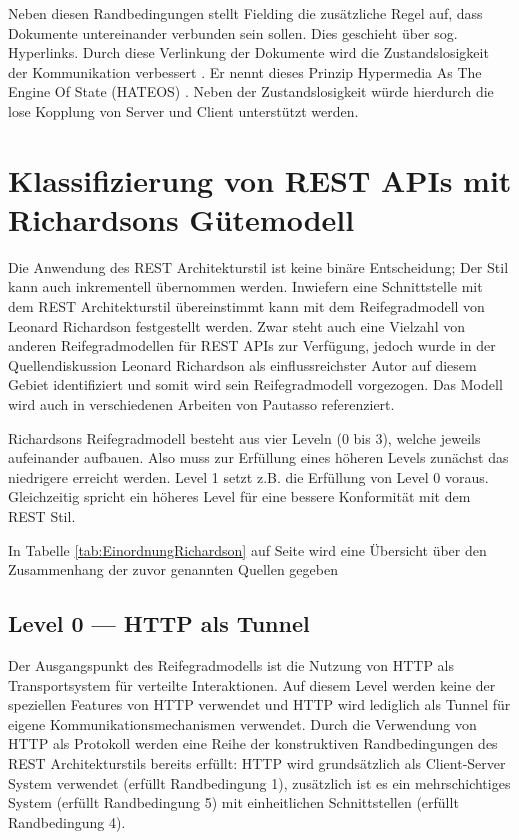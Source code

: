 Neben diesen Randbedingungen stellt Fielding die zusätzliche Regel auf, dass Dokumente untereinander verbunden sein sollen. Dies geschieht über sog. Hyperlinks. Durch diese Verlinkung der Dokumente wird die Zustandslosigkeit der Kommunikation verbessert . Er nennt dieses Prinzip Hypermedia As The Engine Of State (HATEOS)  . Neben der Zustandslosigkeit würde hierdurch die lose Kopplung von Server und Client unterstützt werden.

\section{Klassifizierung von REST APIs mit Richardsons Gütemodell}\label{section:klassifizierung-von-rest}

Die Anwendung des REST Architekturstil ist keine binäre Entscheidung; Der Stil kann auch inkrementell übernommen werden. Inwiefern eine Schnittstelle mit dem REST Architekturstil übereinstimmt kann mit dem Reifegradmodell von Leonard Richardson festgestellt werden. Zwar steht auch eine Vielzahl von anderen Reifegradmodellen für REST APIs zur Verfügung, jedoch wurde in der Quellendiskussion Leonard Richardson als einflussreichster Autor auf diesem Gebiet identifiziert und somit wird sein Reifegradmodell vorgezogen. Das Modell wird auch in verschiedenen Arbeiten  von Pautasso referenziert.

Richardsons Reifegradmodell besteht aus vier Leveln (0 bis 3), welche jeweils aufeinander aufbauen. Also muss zur Erfüllung eines höheren Levels zunächst das niedrigere erreicht werden. Level 1 setzt z.B. die Erfüllung von Level 0 voraus. Gleichzeitig spricht ein höheres Level für eine bessere Konformität mit dem REST Stil.

In Tabelle \ref{tab:EinordnungRichardson} auf Seite \pageref{tab:EinordnungRichardson} wird eine Übersicht über den Zusammenhang der zuvor genannten Quellen gegeben 

\subsection{Level 0 — HTTP als Tunnel}\label{subsection:level-0}

Der Ausgangspunkt des Reifegradmodells ist die Nutzung von HTTP als Transportsystem für verteilte Interaktionen. Auf diesem Level werden keine der speziellen Features von HTTP verwendet und HTTP wird lediglich als Tunnel für eigene Kommunikationsmechanismen verwendet. Durch die Verwendung von HTTP als Protokoll werden eine Reihe der konstruktiven Randbedingungen des REST Architekturstils bereits erfüllt: HTTP wird grundsätzlich als Client-Server System verwendet (erfüllt Randbedingung 1), zusätzlich ist es ein mehrschichtiges System (erfüllt Randbedingung 5) mit einheitlichen Schnittstellen (erfüllt Randbedingung 4).

